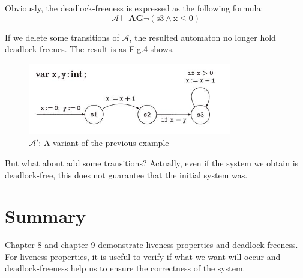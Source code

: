 \documentclass{acmtog} %
\begin{document}
    Obviously, the deadlock-freeness is expressed as the following formula:
    \begin{equation*}
      \mathcal{A}\models\textbf{AG}\neg(\text{s3}\wedge\text{x}\leq0)
    \end{equation*}
    
    If we delete some transitions of $\mathcal{A}$, the resulted automaton no longer hold deadlock-freenes. The result is as Fig.4 shows.
    \begin{figure}[H]
      \centering
      \includegraphics[width=3.5in]{4.jpg}
      \caption{$\mathcal{A}'$: A variant of the previous example}
    \end{figure}
    
    But what about add some transitions? Actually, even if the system we obtain is deadlock-free, this does not guarantee that the initial system was.
    
\section{Summary}
    Chapter 8 and chapter 9 demonstrate liveness properties and deadlock-freeness. For liveness properties, it is useful to verify if what we want will occur and deadlock-freeness help us to ensure the correctness of the system. 
\end{document}
